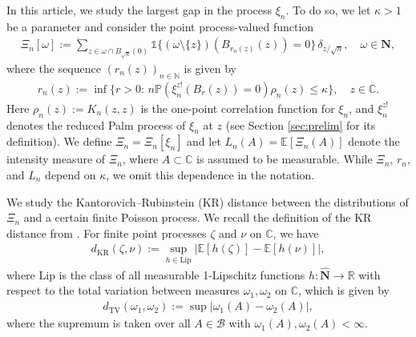 \documentclass{amsart}
\theoremstyle{plain}
\theoremstyle{definition}
\theoremstyle{remark}
\def\E{\mathbb E}
\def\P{\mathbb P}
\def\one{\mathds1}
\begin{document}
In this article, we study the largest gap in the process $\xi_n$. To do so, we let $\kappa>1$ be a parameter and consider the point process-valued function
\begin{align}
	\Xi_{n}[\omega]:=\sum_{z \in \omega \cap B_{\sqrt n}(0)} \one\{(\omega \setminus \{z\}) (B_{r_{n}(z)}(z))=0\} \,\delta_{z/\sqrt n}, \quad \omega \in \mathbf N, \label{def:Xin}
\end{align}
where the sequence $(r_{n}(z))_{n \in \mathbb N}$ is given by
\begin{align}
r_{n}(z):=\inf\{r>0:\, n \P(\xi_n^{z!}(B_{r}(z))=0) \rho_n(z)\le \kappa \},\quad z \in \mathbb C.\label{def:rcn}
\end{align}
Here $\rho_n(z):=K_n(z,z)$ is the one-point correlation function for $\xi_n$, and $\xi_n^{z!}$ denotes the reduced Palm process of $\xi_n$ at $z$ (see Section \ref{sec:prelim} for its definition).
We define  $\Xi_{n}=\Xi_{n}[\xi_n]$ and let $L_n(A)= \E [\Xi_n(A)]$ denote the intensity measure of $\Xi_n$, where $A \subset \mathbb{C}$ is assumed to be measurable. While $\Xi_{n}$, $r_n$, and $L_n$ depend on $\kappa$, we  omit this dependence in the notation.

We study the Kantorovich--Rubinstein (KR) distance between the distributions of $\Xi_n$ and a certain finite Poisson process. We recall the definition of the KR distance from \cite{DST16}. For finite point processes $\zeta$ and $\nu$ on $\mathbb{C}$, we have 
\begin{align}
	{d_{\mathrm{KR}}}(\zeta, \nu) := \sup_{h \in \text{Lip}}\big|\mathbb{E} [h(\zeta)]-\mathbb{E} [h(\nu)]\big|,\label{dkr}
\end{align}
where $\text{Lip}$ is the class of all measurable 1-Lipschitz functions $h\colon \widehat{\mathbf{N}} \to \mathbb{R}$ with respect to the total variation between measures $\omega_1, \omega_2$ on $\mathbb{C}$, which is given by
\begin{align*}
	d_{\text{TV}}(\omega_1,\omega_2):=\sup |\omega_1(A)-\omega_2(A)|,
\end{align*}
where the supremum is taken over all $A \in \mathcal B$ with $\omega_1(A), \omega_2(A)<\infty$. 
\end{document}
